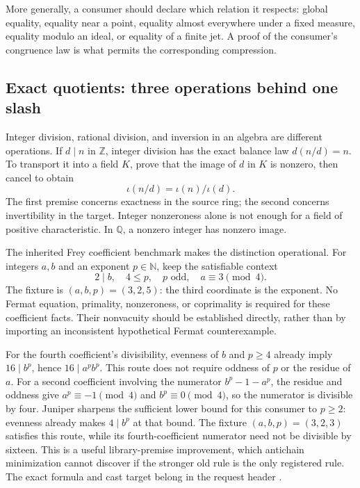 \documentclass[11pt,letterpaper]{article}
\newcommand{\N}{\mathbb N}\newcommand{\Z}{\mathbb Z}
\newcommand{\Q}{\mathbb Q}\newcommand{\R}{\mathbb R}
\theoremstyle{definition}\newtheorem{definition}[proposition]{Definition}
\theoremstyle{remark}\newtheorem{remark}[proposition]{Remark}
\begin{document}
More generally, a consumer should declare which relation it respects:
global equality, equality near a point, equality almost everywhere under a
fixed measure, equality modulo an ideal, or equality of a finite jet. A proof
of the consumer's congruence law is what permits the corresponding compression.

\subsection{Exact quotients: three operations behind one slash}

Integer division, rational division, and inversion in an algebra are different
operations. If $d\mid n$ in $\Z$, integer division has the exact balance law
$d(n/d)=n$. To transport it into a field $K$, prove that the image of $d$ in
$K$ is nonzero, then cancel to obtain
\[
 \iota(n/d)=\iota(n)/\iota(d).
\]
The first premise concerns exactness in the source ring; the second concerns
invertibility in the target. Integer nonzeroness alone is not enough for a
field of positive characteristic. In $\Q$, a nonzero integer has nonzero image.

The inherited Frey coefficient benchmark makes the distinction operational.
For integers $a,b$ and an exponent $p\in\N$, keep the satisfiable context
\[
 2\mid b,\quad 4\le p,\quad p\text{ odd},
 \quad a\equiv3\pmod4.
\]
The fixture is $(a,b,p)=(3,2,5)$: the third coordinate is the exponent.
No Fermat equation, primality, nonzeroness, or coprimality is required for
these coefficient facts. Their nonvacuity should be established directly,
rather than by importing an inconsistent hypothetical Fermat counterexample.

For the fourth coefficient's divisibility, evenness of $b$ and $p\ge4$
already imply $16\mid b^p$, hence $16\mid a^p b^p$. This route does not
require oddness of $p$ or the residue of $a$. For a second coefficient
involving the numerator $b^p-1-a^p$, the residue and oddness give
$a^p\equiv-1\pmod4$ and $b^p\equiv0\pmod4$, so the numerator is divisible
by four. Juniper sharpens the sufficient lower bound for this consumer to
$p\ge2$: evenness already makes $4\mid b^p$ at that bound. The fixture
$(a,b,p)=(3,2,3)$ satisfies this route, while its fourth-coefficient numerator
need not be divisible by sixteen. This is a useful library-premise improvement,
which antichain minimization cannot discover if the stronger old rule is the
only registered rule. The exact formula and cast target belong in the request
header \cite{juniper}.
\end{document}
